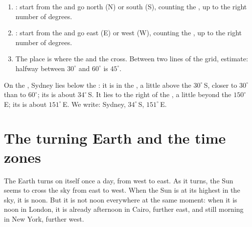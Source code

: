\begin{method}\label{met:g6:latitude-longitude:locating}
\begin{enumerate}
  \item {}: start from the  and go north (N) or south (S),
        counting the , up to the right number of degrees.
  \item {}: start from the  and go east (E) or west
        (W), counting the , up to the right number of degrees.
  \item The place is where the  and the  cross. Between two
        lines of the grid, estimate: halfway between $30^\circ$ and
        $60^\circ$ is $45^\circ$.
\end{enumerate}
\end{method}

\begin{example}\label{ex:g6:latitude-longitude:sydney}
On the , Sydney lies below the : it is in the , a little above the  $30^\circ$\,S, closer to $30^\circ$
than to $60^\circ$; its  is about $34^\circ$\,S. It lies to the right
of the , a little beyond the  $150^\circ$\,E; its
 is about $151^\circ$\,E. We write: Sydney, $34^\circ$\,S,
$151^\circ$\,E.
\end{example}

\section{The turning Earth and the time zones}

The Earth turns on itself once a day, from west to east. As it turns, the
Sun seems to cross the sky from east to west. When the Sun is at its highest
in the sky, it is noon. But it is not noon everywhere at the same moment:
when it is noon in London, it is already afternoon in Cairo, further east,
and still morning in New York, further west.

